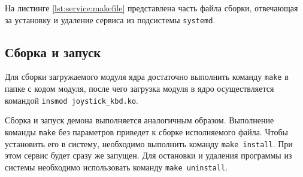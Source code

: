 
На листинге \ref{lst:service:makefile} представлена часть файла сборки, отвечающая за установку и удаление сервиса из подсистемы \texttt{systemd}.


\subsection{Сборка и запуск}

Для сборки загружаемого модуля ядра достаточно выполнить команду \texttt{make} в папке с кодом модуля, после чего загрузка модуля в ядро осуществляется командой \texttt{insmod joystick\_kbd.ko}.

Сборка и запуск демона выполняется аналогичным образом. Выполнение команды \texttt{make} без параметров приведет к сборке исполняемого файла. Чтобы установить его в систему, необходимо выполнить команду \texttt{make install}. При этом сервис будет сразу же запущен. Для остановки и удаления программы из системы необходимо использовать команду \texttt{make uninstall}.

\pagebreak
